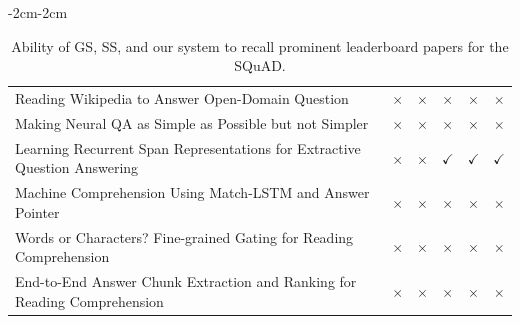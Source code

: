 \documentclass[runningheads]{llncs}
\begin{document}
\begin{table}
\begin{adjustwidth}{-2cm}{-2cm}
{\begin{tabular}{|l|c|c|c|c|c|}
Reading Wikipedia to Answer Open-Domain Question                                           & \cellcolor{red!20}$\times$                   & \cellcolor{red!20}$\times$                   & \cellcolor{red!20}$\times$     & \cellcolor{red!20}$\times$     & \cellcolor{red!20}$\times$     \\
Making Neural QA as Simple as Possible but not Simpler                                     & \cellcolor{red!20}$\times$                   & \cellcolor{red!20}$\times$                   & \cellcolor{red!20}$\times$     & \cellcolor{red!20}$\times$     & \cellcolor{red!20}$\times$     \\
Learning Recurrent Span Representations for Extractive Question Answering                  & \cellcolor{red!20}$\times$                   & \cellcolor{red!20}$\times$                   & \cellcolor{green!20}$\checkmark$ & \cellcolor{green!20}$\checkmark$ & \cellcolor{green!20}$\checkmark$ \\
Machine Comprehension Using Match-LSTM and Answer Pointer                                  & \cellcolor{red!20}$\times$                   & \cellcolor{red!20}$\times$                   & \cellcolor{red!20}$\times$     & \cellcolor{red!20}$\times$     & \cellcolor{red!20}$\times$     \\
Words or Characters? Fine-grained Gating for Reading Comprehension & \cellcolor{red!20}$\times$ & \cellcolor{red!20}$\times$                   & \cellcolor{red!20}$\times$     & \cellcolor{red!20}$\times$     & \cellcolor{red!20}$\times$ \\
End-to-End Answer Chunk Extraction and Ranking for Reading Comprehension   & \cellcolor{red!20}$\times$  & \cellcolor{red!20}$\times$                   & \cellcolor{red!20}$\times$     & \cellcolor{red!20}$\times$     & \cellcolor{red!20}$\times$ \\
\hline
\end{tabular}}
\caption{Ability of GS, SS, and our system to recall prominent leaderboard papers for the SQuAD.}
\end{adjustwidth}
\end{table}
\end{document}
